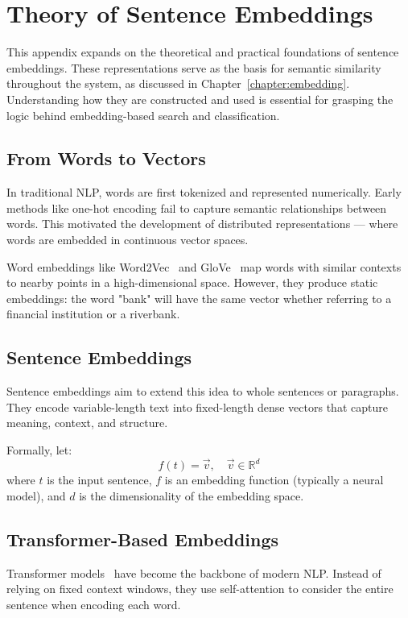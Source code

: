 \chapter{Theory of Sentence Embeddings}
\label{appendix:embedding-theory}

This appendix expands on the theoretical and practical foundations of sentence embeddings. These representations serve as the basis for semantic similarity throughout the system, as discussed in Chapter~\ref{chapter:embedding}. Understanding how they are constructed and used is essential for grasping the logic behind embedding-based search and classification.

\section{From Words to Vectors}
In traditional NLP, words are first tokenized and represented numerically. Early methods like one-hot encoding fail to capture semantic relationships between words. This motivated the development of distributed representations — where words are embedded in continuous vector spaces.

Word embeddings like Word2Vec~\parencite{mikolov2013efficient} and GloVe~\parencite{pennington2014glove} map words with similar contexts to nearby points in a high-dimensional space. However, they produce static embeddings: the word "bank" will have the same vector whether referring to a financial institution or a riverbank.

\section{Sentence Embeddings}
Sentence embeddings aim to extend this idea to whole sentences or paragraphs. They encode variable-length text into fixed-length dense vectors that capture meaning, context, and structure.

Formally, let:
\[
f(t) = \vec{v}, \quad \vec{v} \in \mathbb{R}^d
\]
where \( t \) is the input sentence, \( f \) is an embedding function (typically a neural model), and \( d \) is the dimensionality of the embedding space.

\section{Transformer-Based Embeddings}
Transformer models~\parencite{vaswani2017attention} have become the backbone of modern NLP. Instead of relying on fixed context windows, they use self-attention to consider the entire sentence when encoding each word.


